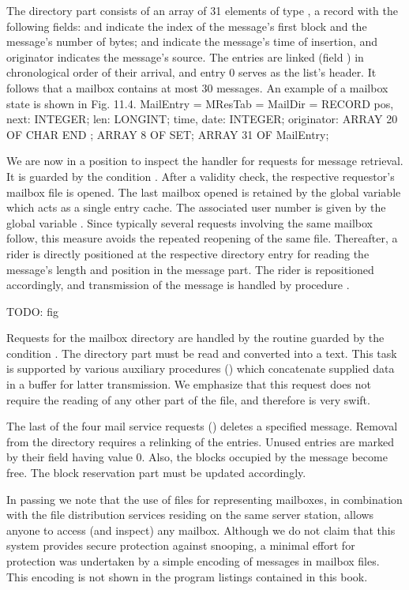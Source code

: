 The directory part consists of an array of 31 elements of type , a record with the following fields:  and  indicate the index of the message's first block and the message's number of bytes;  and  indicate the message's time of insertion, and originator indicates the message's source. The entries are linked (field ) in chronological order of their arrival, and entry 0 serves as the list's header. It follows that a mailbox contains at most 30 messages. An example of a mailbox state is shown in Fig. 11.4.
\begintt
MailEntry =
MResTab = MailDir =
RECORD
pos, next: INTEGER;
len: LONGINT;
time, date: INTEGER; originator: ARRAY 20 OF CHAR
END ;
ARRAY 8 OF SET; ARRAY 31 OF MailEntry;
\endtt

\noindent We are now in a position to inspect the handler for requests for message retrieval. It is guarded by the condition . After a validity check, the respective requestor's mailbox file is opened. The last mailbox opened is retained by the global variable  which acts as a single entry cache. The associated user number is given by the global variable . Since typically several requests involving the same mailbox follow, this measure avoids the repeated reopening of the same file. Thereafter, a rider is directly positioned at the respective directory entry for reading the message's length and position in the message part. The rider is repositioned accordingly, and transmission of the message is handled by procedure .

TODO: fig

Requests for the mailbox directory are handled by the routine guarded by the condition . The directory part must be read and converted into a text. This task is supported by various auxiliary procedures () which concatenate supplied data in a buffer for latter transmission. We emphasize that this request does not require the reading of any other part of the file, and therefore is very swift.

The last of the four mail service requests () deletes a specified message. Removal from the directory requires a relinking of the entries. Unused entries are marked by their  field having value 0. Also, the blocks occupied by the message become free. The block reservation part must be updated accordingly.

In passing we note that the use of files for representing mailboxes, in combination with the file distribution services residing on the same server station, allows anyone to access (and inspect) any mailbox. Although we do not claim that this system provides secure protection against snooping, a minimal effort for protection was undertaken by a simple encoding of messages in mailbox files. This encoding is not shown in the program listings contained in this book.

